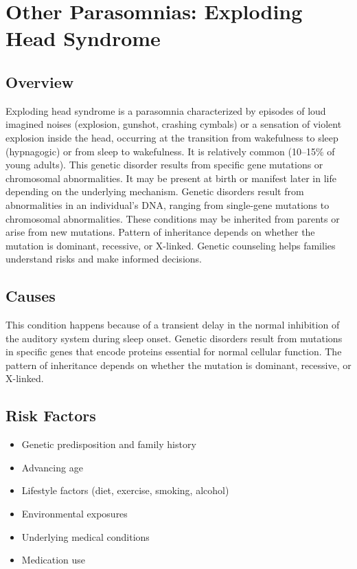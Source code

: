 \chapter{Other Parasomnias: Exploding Head Syndrome}
\label{sec:Exploding Head Syndrome}

\section{Overview}
Exploding head syndrome is a parasomnia characterized by episodes of loud imagined noises (explosion, gunshot, crashing cymbals) or a sensation of violent explosion inside the head, occurring at the transition from wakefulness to sleep (hypnagogic) or from sleep to wakefulness. It is relatively common (10--15\% of young adults). This genetic disorder results from specific gene mutations or chromosomal abnormalities. It may be present at birth or manifest later in life depending on the underlying mechanism. Genetic disorders result from abnormalities in an individual's DNA, ranging from single-gene mutations to chromosomal abnormalities. These conditions may be inherited from parents or arise from new mutations. Pattern of inheritance depends on whether the mutation is dominant, recessive, or X-linked. Genetic counseling helps families understand risks and make informed decisions.
\section{Causes}
This condition happens because of a transient delay in the normal inhibition of the auditory system during sleep onset. Genetic disorders result from mutations in specific genes that encode proteins essential for normal cellular function. The pattern of inheritance depends on whether the mutation is dominant, recessive, or X-linked.   
\section{Risk Factors}

\begin{itemize}[noitemsep]
  \item Genetic predisposition and family history
  \item Advancing age
  \item Lifestyle factors (diet, exercise, smoking, alcohol)
  \item Environmental exposures
  \item Underlying medical conditions
  \item Medication use
\end{itemize}
